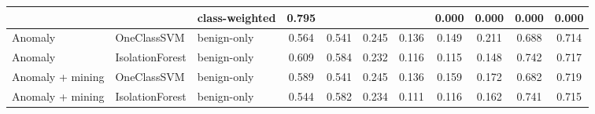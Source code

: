 \begin{table}[htbp]
{\begin{tabular}{lllcccccccc}
 &  & class-weighted & 0.795 &  &  &  & 0.000 & 0.000 & 0.000 & 0.000 \\
\midrule
Anomaly & OneClassSVM & benign-only & 0.564 & 0.541 & 0.245 & 0.136 & 0.149 & 0.211 & 0.688 & 0.714 \\
Anomaly & IsolationForest & benign-only & 0.609 & 0.584 & 0.232 & 0.116 & 0.115 & 0.148 & 0.742 & 0.717 \\
Anomaly + mining & OneClassSVM & benign-only & 0.589 & 0.541 & 0.245 & 0.136 & 0.159 & 0.172 & 0.682 & 0.719 \\
Anomaly + mining & IsolationForest & benign-only & 0.544 & 0.582 & 0.234 & 0.111 & 0.116 & 0.162 & 0.741 & 0.715 \\
\bottomrule
\end{tabular}%
}
\end{table}

